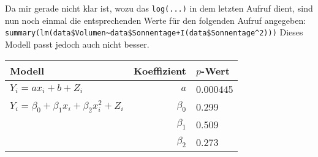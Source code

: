 \documentclass[a4paper]{scrartcl}
\def \blattnr {10}
\begin{document}
\begin{enumerate}[label=\bfseries \blattnr.\arabic*]
\begin{enumerate}
         Da mir gerade nicht klar ist, wozu das \lstinline{log(...)} in dem
         letzten Aufruf dient, sind nun noch einmal die entsprechenden Werte
         für den folgenden Aufruf angegeben:
         \lstinline{summary(lm(data$Volumen~data$Sonnentage+I(data$Sonnentage^2)))}
         Dieses Modell passt jedoch auch nicht besser.
         \begin{table}[h]
             \centering
             \begin{tabular}{l|r|l}
                 Modell & Koeffizient & $p$-Wert \\ \hline
                 $Y_i = a x_i + b + Z_i$ & $a$ & \num{0.000445} \\ \hline
                 $Y_i = \beta_0 + \beta_1x_i + \beta_2x_i^2 + Z_i$ & $\beta_0$ & \num{0.299} \\
                                                                   & $\beta_1$ & \num{0.509} \\
                                                                   & $\beta_2$ & \num{0.273} \\
             \end{tabular}
         \end{table}
    \end{enumerate}
\end{enumerate}
\end{document}
